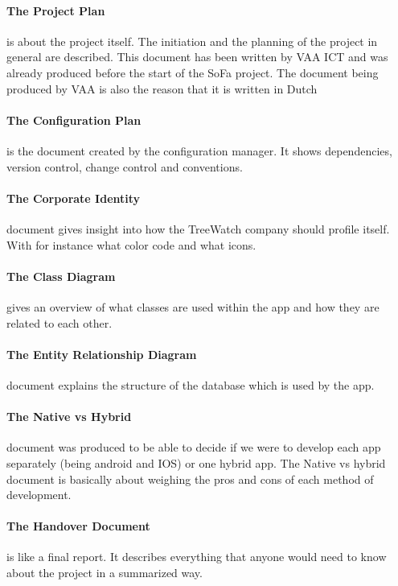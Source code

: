 \documentclass[12pt]{report}
\begin{document}
  \paragraph*{The Project Plan} is about the project itself. The initiation and the planning of the project in general are described. This document has been written by VAA ICT and was already produced before the start of the SoFa project. The document being produced by VAA is also the reason that it is written in Dutch
    
  \paragraph*{The Configuration Plan} is the document created by the configuration manager. It shows dependencies, version control, change control and conventions.
  
  \paragraph*{The Corporate Identity} document gives insight into how the TreeWatch company should profile itself. With for instance what color code and what icons.
  
  \paragraph*{The Class Diagram} gives an overview of what classes are used within the app and how they are related to each other.
  
  \paragraph*{The Entity Relationship Diagram} document explains the structure of the database which is used by the app.
  
  \paragraph*{The Native vs Hybrid} document was produced to be able to decide if we were to develop each app separately (being android and IOS) or one hybrid app. The Native vs hybrid document is basically about weighing the pros and cons of each method of development.
  
  \paragraph*{The Handover Document} is like a final report. It describes everything that anyone would need to know about the project in a summarized way.
  
\end{document}
